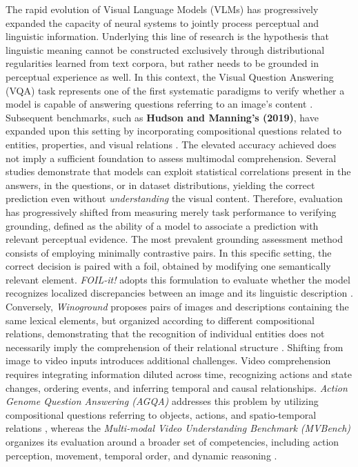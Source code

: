 The rapid evolution of Visual Language Models (\acsp{VLM}) has progressively expanded the capacity of neural systems to jointly process perceptual and linguistic information.
Underlying this line of research is the hypothesis that linguistic meaning cannot be constructed exclusively through distributional regularities learned from text corpora, but rather needs to be grounded in perceptual experience as well\cite{baroni2015grounding}.
In this context, the Visual Question Answering (\acs{VQA}) task represents one of the first systematic paradigms to verify whether a model is capable of answering questions referring to an image's content \cite{antol2015vqa}.
Subsequent benchmarks, such as \textbf{Hudson and Manning's (2019)}, have expanded upon this setting by incorporating compositional questions related to entities, properties, and visual relations \cite{hudson2019gqa}.
The elevated accuracy achieved does not imply a sufficient foundation to assess multimodal comprehension. Several studies demonstrate that models can exploit statistical correlations present in the answers, in the questions, or in dataset distributions, yielding the correct prediction even without \textit{understanding} the visual content.
Therefore, evaluation has progressively shifted from measuring merely task performance to verifying grounding, defined as the ability of a model to associate a prediction with relevant perceptual evidence.
The most prevalent grounding assessment method consists of employing minimally contrastive pairs. In this specific setting, the correct decision is paired with a foil, obtained by modifying one semantically relevant element. \textit{FOIL-it!} adopts this formulation to evaluate whether the model recognizes localized discrepancies between an image and its linguistic description \cite{shekhar2017foilit}.
Conversely, \textit{Winoground} proposes pairs of images and descriptions containing the same lexical elements, but organized according to different compositional relations, demonstrating that the recognition of individual entities does not necessarily imply the comprehension of their relational structure \cite{thrush2022winoground}.
Shifting from image to video inputs introduces additional challenges. Video comprehension requires integrating information diluted across time, recognizing actions and state changes, ordering events, and inferring temporal and causal relationships. \textit{Action Genome Question Answering (\acs{AGQA})} addresses this problem by utilizing compositional questions referring to objects, actions, and spatio-temporal relations \cite{grundemclaughlin2021agqa}, whereas the \textit{Multi-modal Video Understanding Benchmark (\acs{MVBench})} organizes its evaluation around a broader set of competencies, including action perception, movement, temporal order, and dynamic reasoning \cite{li2024mvbench}.
